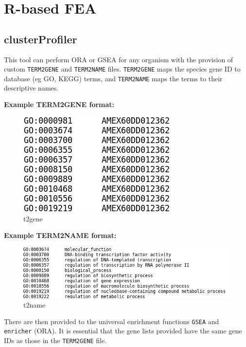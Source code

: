\documentclass[
]{book}
\begin{document}
\hypertarget{r-based-fea}{%
\section{R-based FEA}\label{r-based-fea}}

\hypertarget{clusterprofiler}{%
\subsection{clusterProfiler}\label{clusterprofiler}}

This tool can perform ORA or GSEA for any organism with the provision of custom \texttt{TERM2GENE} and \texttt{TERM2NAME} files. \texttt{TERM2GENE} maps the species gene ID to database (eg GO, KEGG) terms, and \texttt{TERM2NAME} maps the terms to their descriptive names.

\textbf{Example TERM2GENE format:}

\begin{figure}
\centering
\includegraphics{images/axolotl-term2gene.png}
\caption{t2gene}
\end{figure}

\textbf{Example TERM2NAME format:}

\begin{figure}
\centering
\includegraphics{images/axolotl-term2name.png}
\caption{t2name}
\end{figure}

There are then provided to the universal enrichment functions \texttt{GSEA} and \texttt{enricher} (ORA). It is essential that the gene lists provided have the same gene IDs as those in the \texttt{TERM2GENE} file.
\end{document}

